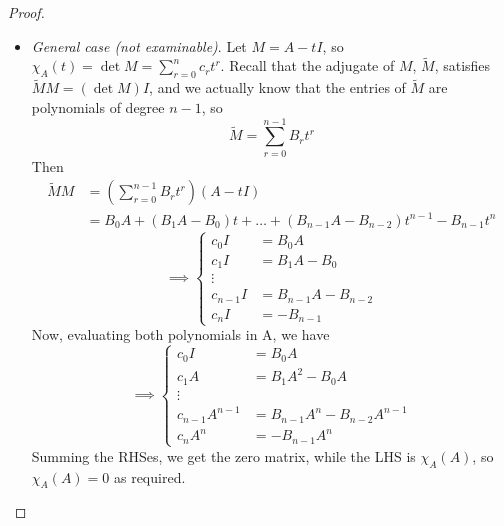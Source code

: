 \documentclass{../../template/note}
\begin{document}
\begin{proof}
\begin{itemize}
\[\begin{pmatrix}
                 \chi_A(\lambda_1) & \cdots & 0 \\
                 \vdots & \ddots & \vdots \\
                 0 & \cdots & \chi_A(\lambda_n) \\
                \end{pmatrix} = 0
            \]
            where 0 is the zero matrix. Then, since \(A = PDP^{-1}\), we have \(A = PD^rP^{-1}\), and so
            \begin{align*}
                \chi_A(A) &= \chi_A(PDP^{-1}) \\
                &= P\chi_A(D)P^{-1} \\
                &= 0
            \end{align*}
            \item \emph{General case (not examinable)}. Let \(M = A - tI\), so \(\chi_A(t) = \det M = \sum_{r=0}^n c_rt^r\). Recall that the adjugate of \(M\), \(\tilde M\), satisfies \(\tilde MM = (\det M)I\), and we actually know that the entries of \(\tilde M\) are polynomials of degree \(n-1\), so
            \[
                \tilde M = \sum_{r=0}^{n-1} B_r t^r
            \]
            Then
            \begin{align*}
                \tilde MM &= \left(\sum_{r=0}^{n-1} B_r t^r\right)(A - tI) \\
                &= B_0A + (B_1A - B_0)t + \dots + (B_{n-1}A - B_{n-2})t^{n-1} - B_{n-1}t^n
            \end{align*}
            \[
                \implies \begin{cases}
                    c_0I &= B_0A \\
                    c_1I &= B_1A-B_0 \\
                    \vdots \\
                    c_{n-1}I &= B_{n-1}A - B_{n-2} \\
                    c_nI &= -B_{n-1}
                \end{cases}
            \]
            Now, evaluating both polynomials in A, we have
            \[
                \implies \begin{cases}
                    c_0I &= B_0A \\
                    c_1A &= B_1A^2-B_0A \\
                    \vdots \\
                    c_{n-1}A^{n-1} &= B_{n-1}A^n - B_{n-2}A^{n-1} \\
                    c_nA^n &= -B_{n-1}A^n
                \end{cases}
            \]
            Summing the RHSes, we get the zero matrix, while the LHS is \(\chi_A(A)\), so \(\chi_A(A) = 0\) as required.
        \end{itemize}
    \end{proof}
    
\end{document}
